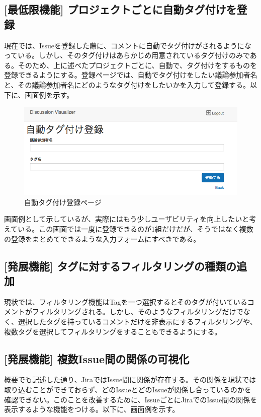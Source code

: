 \documentclass[12pt, oneside]{jreport}
\begin{document}
		\subsection{[最低限機能] プロジェクトごとに自動タグ付けを登録}
		現在では、Issueを登録した際に、コメントに自動でタグ付けがされるようになっている。しかし、そのタグ付けはあらかじめ用意されているタグ付けのみである。そのため、上に述べたプロジェクトごとに、自動で、タグ付けをするものを登録できるようにする。登録ページでは、自動でタグ付けをしたい議論参加者名と、その議論参加者名にどのようなタグ付けをしたいかを入力して登録する。以下に、画面例を示す。
		\begin{figure}[H]
		\centering
		\includegraphics[width=17cm,bb=500 300 -200 27]{TagAdd.png}
		\caption{自動タグ付け登録ページ}
		\end{figure}
		
		画面例として示しているが、実際にはもう少しユーザビリティを向上したいと考えている。この画面では一度に登録できるのが1組だけだが、そうではなく複数の登録をまとめてできるような入力フォームにすべきである。

		\subsection{[発展機能] タグに対するフィルタリングの種類の追加}
		現状では、フィルタリング機能はTagを一つ選択するとそのタグが付いているコメントがフィルタリングされる。しかし、そのようなフィルタリングだけでなく、選択したタグを持っているコメントだけを非表示にするフィルタリングや、複数タグを選択してフィルタリングをすることもできるようにする。

		\subsection{[発展機能] 複数Issue間の関係の可視化}
		概要でも記述した通り、JiraではIssue間に関係が存在する。その関係を現状では取り込むことができておらず、どのIssueとどのIssueが関係し合っているのかを確認できない。このことを改善するために、IssueごとにJiraでのIssue間の関係を表示するような機能をつける。以下に、画面例を示す。
		
\end{document}
